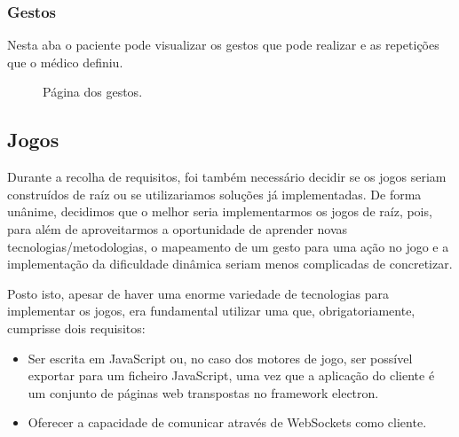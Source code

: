 \documentclass{TTUPhD}
\begin{document}
\newpage

\subsubsection{Gestos}

Nesta aba o paciente pode visualizar os gestos que pode realizar e as repetições que o médico definiu.

\begin{figure}[h!]
    \center
    \caption{Página dos gestos.}
    \label{fig:patient6}
\end{figure}

\subsection{Jogos}

Durante a recolha de requisitos, foi também necessário decidir se os jogos seriam construídos de raíz ou se utilizariamos soluções já implementadas.
De forma unânime, decidimos que o melhor seria implementarmos os jogos de raíz, pois, para além de aproveitarmos a oportunidade de aprender novas tecnologias/metodologias,
o mapeamento de um gesto para uma ação no jogo e a implementação da dificuldade dinâmica seriam menos complicadas de concretizar.

Posto isto, apesar de haver uma enorme variedade de tecnologias para implementar os jogos, era fundamental utilizar uma que, obrigatoriamente, cumprisse dois requisitos:

\begin{itemize}
	\item Ser escrita em JavaScript ou, no caso dos motores de jogo, ser possível exportar para um ficheiro JavaScript, uma vez que a aplicação do cliente
		  é um conjunto de páginas web transpostas no framework electron.
	\item Oferecer a capacidade de comunicar através de WebSockets como cliente.
\end{itemize}
\end{document}
